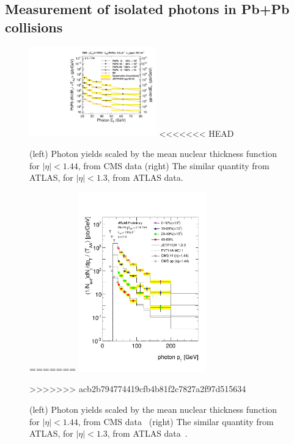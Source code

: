 \subsection{Measurement of isolated photons in Pb+Pb collisions}

\begin{figure}[!htb]
\begin{center}
\includegraphics[width=0.49\textwidth]{electroweak_figs/TAAScaling.pdf}
<<<<<<< HEAD
\caption[]{(left) Photon yields scaled by the mean nuclear thickness function for $|\eta|<1.44$, from CMS data (right) The similar quantity from ATLAS, for $|\eta|<1.3$, from ATLAS data.}
\label{fig:pas:zw}
=======
\includegraphics[width=0.49\textwidth]{electroweak_figs/ph_fig_11.pdf}
\caption[]{(left) Photon yields scaled by the mean nuclear thickness function for $|\eta|<1.44$, from CMS data~\cite{Chatrchyan:2012vq} (right) The similar quantity from ATLAS, for $|\eta|<1.3$, from ATLAS data~\cite{ATLAS:2012zla}.}
\label{fig:pas:photon}
>>>>>>> acb2b794774419cfb4b81f2c7827a2f97d515634
\end{center}
\end{figure}

